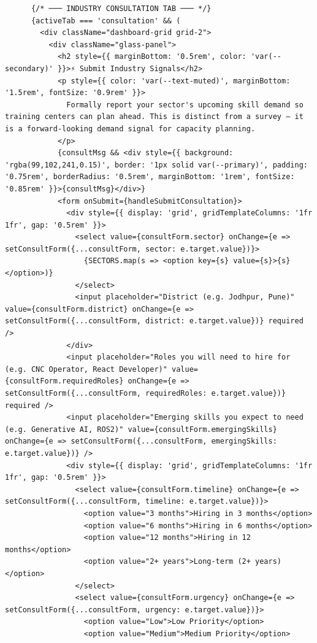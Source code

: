 \documentclass[12pt,a4paper]{report}
\begin{document}
\begin{verbatim}
      {/* ─── INDUSTRY CONSULTATION TAB ─── */}
      {activeTab === 'consultation' && (
        <div className="dashboard-grid grid-2">
          <div className="glass-panel">
            <h2 style={{ marginBottom: '0.5rem', color: 'var(--secondary)' }}>⚡ Submit Industry Signals</h2>
            <p style={{ color: 'var(--text-muted)', marginBottom: '1.5rem', fontSize: '0.9rem' }}>
              Formally report your sector's upcoming skill demand so training centers can plan ahead. This is distinct from a survey — it is a forward-looking demand signal for capacity planning.
            </p>
            {consultMsg && <div style={{ background: 'rgba(99,102,241,0.15)', border: '1px solid var(--primary)', padding: '0.75rem', borderRadius: '0.5rem', marginBottom: '1rem', fontSize: '0.85rem' }}>{consultMsg}</div>}
            <form onSubmit={handleSubmitConsultation}>
              <div style={{ display: 'grid', gridTemplateColumns: '1fr 1fr', gap: '0.5rem' }}>
                <select value={consultForm.sector} onChange={e => setConsultForm({...consultForm, sector: e.target.value})}>
                  {SECTORS.map(s => <option key={s} value={s}>{s}</option>)}
                </select>
                <input placeholder="District (e.g. Jodhpur, Pune)" value={consultForm.district} onChange={e => setConsultForm({...consultForm, district: e.target.value})} required />
              </div>
              <input placeholder="Roles you will need to hire for (e.g. CNC Operator, React Developer)" value={consultForm.requiredRoles} onChange={e => setConsultForm({...consultForm, requiredRoles: e.target.value})} required />
              <input placeholder="Emerging skills you expect to need (e.g. Generative AI, ROS2)" value={consultForm.emergingSkills} onChange={e => setConsultForm({...consultForm, emergingSkills: e.target.value})} />
              <div style={{ display: 'grid', gridTemplateColumns: '1fr 1fr', gap: '0.5rem' }}>
                <select value={consultForm.timeline} onChange={e => setConsultForm({...consultForm, timeline: e.target.value})}>
                  <option value="3 months">Hiring in 3 months</option>
                  <option value="6 months">Hiring in 6 months</option>
                  <option value="12 months">Hiring in 12 months</option>
                  <option value="2+ years">Long-term (2+ years)</option>
                </select>
                <select value={consultForm.urgency} onChange={e => setConsultForm({...consultForm, urgency: e.target.value})}>
                  <option value="Low">Low Priority</option>
                  <option value="Medium">Medium Priority</option>

\end{verbatim}
\end{document}
